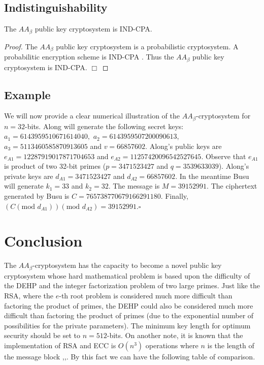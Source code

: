 \documentclass{llncs}
\begin{document}
\subsection{Indistinguishability}
\begin{proposition}
The $AA_\beta$ public key cryptosystem is IND-CPA.
\end{proposition}
\begin{proof}
The $AA_\beta$ public key cryptosystem is a probabilistic
cryptosystem. A probabilitic encryption scheme is IND-CPA
\cite{16}. Thus the $AA_\beta$ public key cryptosystem is IND-CPA.
$\Box$
\end{proof}

\subsection{Example}
We will now provide a clear numerical illustration of the
$AA_\beta$-cryptosystem for $n=32$-bits. Along will generate the
following secret keys: $a_{1}=6143959510671614040,$
$a_{2}=6143959507200090613$, $a_{3}=5113460585870913605$ and $v=66857602$.
Along's public keys are $e_{A1}=12287919017871704653$ and
$e_{A2}=11257420096542527645$. Observe that $e_{A1}$ is product of
two 32-bit primes ($p=3471523427$ and $q=3539633039$). Along's
private keys are $d_{A1}=3471523427$ and $d_{A2}=66857602$. In the
meantime Busu will generate $k_{1}=33$ and $k_{2}=32$. The message is
$M=39152991$. The ciphertext generated
by Busu is $C=765738770679166291180$. Finally,
$(C (\textrm{mod } d_{A1}))(\textrm{mod } d_{A2})=39152991$.$\square$

\section{Conclusion}
The $AA_\beta$-cryptosystem has the capacity to become a novel
public key cryptosystem whose hard mathematical problem is based
upon the difficulty of the DEHP and the integer factorization
problem of two large primes. Just like the RSA, where the $e$-th
root problem is considered much more difficult than factoring the
product of primes, the DEHP could also be considered much more
difficult than factoring the product of primes (due to the
exponential number of possibilities for the private parameters).
The minimum key length for optimum security should be set to
$n=512$-bits. On another note, it is known that the implementation
of RSA and ECC is $O(n^3)$ operations where $n$ is the length of
the message block \cite{5},\cite{8},\cite{17}. By this fact we can
have the following table of comparison.
\\
\end{document}
